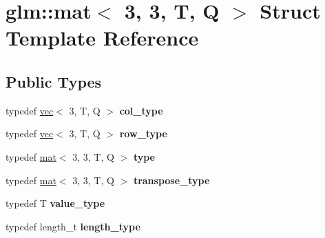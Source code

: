 \hypertarget{structglm_1_1mat_3_013_00_013_00_01T_00_01Q_01_4}{}\section{glm\+:\+:mat$<$ 3, 3, T, Q $>$ Struct Template Reference}
\label{structglm_1_1mat_3_013_00_013_00_01T_00_01Q_01_4}
\subsection*{Public Types}
\begin{DoxyCompactItemize}
\item 
\mbox{\label{structglm_1_1mat_3_013_00_013_00_01T_00_01Q_01_4_a4d84bef3685131dbb0ac43cac0a3b147}} 
typedef \hyperlink{structglm_1_1vec}{vec}$<$ 3, T, Q $>$ {\bfseries col\+\_\+type}
\item 
\mbox{\label{structglm_1_1mat_3_013_00_013_00_01T_00_01Q_01_4_aa7593e64ea44bcccb91580e6f6a45110}} 
typedef \hyperlink{structglm_1_1vec}{vec}$<$ 3, T, Q $>$ {\bfseries row\+\_\+type}
\item 
\mbox{\label{structglm_1_1mat_3_013_00_013_00_01T_00_01Q_01_4_a2e88f5a6401ca62e81b61443f0148ff0}} 
typedef \hyperlink{structglm_1_1mat}{mat}$<$ 3, 3, T, Q $>$ {\bfseries type}
\item 
\mbox{\label{structglm_1_1mat_3_013_00_013_00_01T_00_01Q_01_4_a4ad9d88cb078cca298550c57bad63c21}} 
typedef \hyperlink{structglm_1_1mat}{mat}$<$ 3, 3, T, Q $>$ {\bfseries transpose\+\_\+type}
\item 
\mbox{\label{structglm_1_1mat_3_013_00_013_00_01T_00_01Q_01_4_a1fba85531bcdc9309f4755f30f44dd6f}} 
typedef T {\bfseries value\+\_\+type}
\item 
\mbox{\label{structglm_1_1mat_3_013_00_013_00_01T_00_01Q_01_4_ae1b8524f20936516a48384a2841b5b9d}} 
typedef length\+\_\+t {\bfseries length\+\_\+type}
\end{DoxyCompactItemize}
